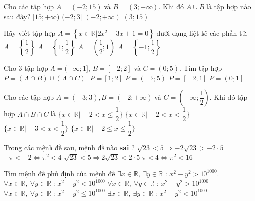 \begin{ex}%
	Cho các tập hợp $A=(-2;15)$ và  $B=(3;+ \infty )$. Khi đó $A \cup B$ là tập hợp nào sau đây?
	\choice
	{$[15;+\infty ) $}
	{$(-2;3] $}
	{\True $(-2;+ \infty ) $}
	{$(3;15) $}
	\loigiai{
	}
\end{ex}

\begin{ex}%
	Hãy viết tập hợp $A=\left\{x\in \mathbb{R}\big| 2x^2-3x+1=0\right\}$ dưới dạng liệt kê các phần tử.
	\choice
	{$A=\left\{\dfrac{1}{2}\right\}$}
	{\True $A=\left\{1; \dfrac{1}{2}\right\}$}
	{$A=\left(\dfrac{1}{2}; 1\right)$}
	{$A=\left\{-1; \dfrac{1}{2}\right\}$}
\end{ex}

\begin{ex}%
	Cho 3 tập hợp $A=(-\infty;1]$, $B=[-2;2]$ và $C=(0;5)$. Tìm tập hợp $P=(A\cap B)\cup (A\cap C)$.
	\choice
	{$P=\left[1;2\right] $}
	{$P= \left(-2;5\right)$}
	{\True$P=\left[-2;1\right]$}
	{$ P=\left(0;1\right]$}
	\loigiai{
	}
\end{ex}

\begin{ex}%
	Cho các tập hợp $A=(-3;3), B=(-2;+\infty )$ và $C=\left( -\infty; \dfrac{1}{2} \right)$. Khi đó tập hợp $A\cap B \cap C$ là
	\choice
	{$ \bigg\lbrace x \in \mathbb{R} \big| -2<x\le \dfrac{1}{2} \bigg\rbrace$}
	{\True $\bigg\lbrace x \in \mathbb{R} \big| -2<x<\dfrac{1}{2} \bigg\rbrace $}
	{$\bigg\lbrace x \in \mathbb{R} \big| -3<x<\dfrac{1}{2} \bigg\rbrace $}
	{$\bigg\lbrace x \in \mathbb{R} \big| -2\le x\le \dfrac{1}{2} \bigg\rbrace $}
	\loigiai{
	}
\end{ex}

\begin{ex}%
	Trong các mệnh đề sau, mệnh đề nào \textbf{sai} ?
	\choice
	{ $\sqrt{23}<5\Rightarrow -2\sqrt{23}>-2\cdot5$}
	{ \True $-\pi <-2\Leftrightarrow {{\pi }^2}<4$}
	{ $\sqrt{23}<5\Rightarrow 2\sqrt{23}<2\cdot5$}
	{ $\pi <4\Leftrightarrow {{\pi }^2}<16$}
	\loigiai{
	}
\end{ex}

\begin{ex}%
	Tìm mệnh đề phủ định của mệnh đề
	$\exists x \in \mathbb{R},\ \exists y \in \mathbb{R}  $ : $x^2-y^2 > 10^{1000}$.
	\choice
	{$\forall x \in \mathbb{R},\ \forall y \in \mathbb{R}  $ : $x^2-y^2  <  10^{1000}$}
	{$\forall x \in \mathbb{R},\ \forall y \in \mathbb{R}  $ : $x^2-y^2 > 10^{1000}$}
	{\True $\forall x \in \mathbb{R},\ \forall y \in \mathbb{R}  $ : $x^2-y^2  \leq  10^{1000}$}
	{$\exists x \in \mathbb{R},\ \exists y \in \mathbb{R}  $ : $x^2-y^2 < 10^{1000}$}
	\loigiai{
	}
\end{ex}

